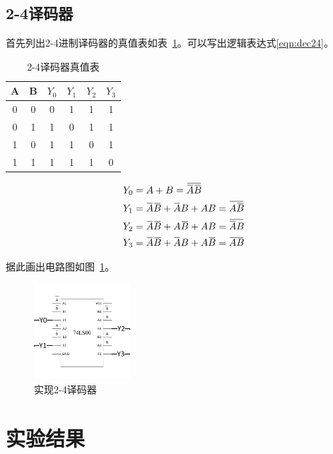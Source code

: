 \documentclass[a4paper,twoside]{ctexart}
\newcommand{\ols}[1]{\mskip.5\thinmuskip\overline{\mskip-.5\thinmuskip {#1} \mskip-.5\thinmuskip}\mskip.5\thinmuskip}
\begin{document}
\begin{spacing}{1.2}
\subsection{2-4译码器}

首先列出2-4进制译码器的真值表如表~\ref{tbl:dec24}。可以写出逻辑表达式\eqref{eqn:dec24}。


\begin{table}[htbp]
	\centering
	\caption{2-4译码器真值表}
	\label{tbl:dec24}
	\begin{tabular}{cc|cccc}
		\toprule
		\hline
		A&B&$Y_0$&$Y_1$&$Y_2$&$Y_3$\\
		\hline
		0&0&0&1&1&1\\
		0&1&1&0&1&1\\
		1&0&1&1&0&1\\
		1&1&1&1&1&0\\
		\hline
		\bottomrule
	\end{tabular}
\end{table}

\begin{equation}
	\label{eqn:dec24}
	\begin{aligned}
		Y_0&=A+B=\ols{\ols{A}\ols{B}}\\
		Y_1&=\ols{A}\ols{B}+\ols{A}B+AB=\ols{A\ols{B}}\\
		Y_2&=\ols{A}\ols{B}+A\ols{B}+AB=\ols{\ols{A}B}\\
		Y_3&=\ols{A}\ols{B}+\ols{A}B+A\ols{B}=\ols{AB}\\
	\end{aligned}
\end{equation}

据此画出电路图如图~\ref{fig:dec24}。

\begin{figure}[H]
	\centering
	\caption{实现2-4译码器}
	\label{fig:dec24}
	\includegraphics[width=0.32\textwidth]{images/32.png}
\end{figure}

\section{实验结果}


\end{spacing}
\end{document}
